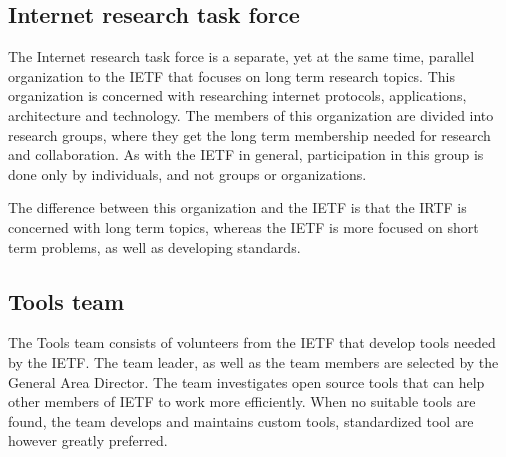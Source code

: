 \documentclass[a4paper,english]{report}
\begin{document}
\subsection{Internet research task force}
The Internet research task force is a separate, yet at the same time, parallel organization to the IETF  that focuses on long term research topics. This organization is concerned with researching internet protocols, applications, architecture and technology. The members of this organization are divided into research groups, where they get the long term membership needed for research and collaboration. As with the IETF in general, participation in this group is done only by individuals, and not groups or organizations.

The difference between this organization and the IETF is that the IRTF is concerned with long term topics, whereas the IETF is more focused on short term problems, as well as developing standards.


\subsection{Tools team}

The Tools team consists of volunteers from the IETF that develop tools needed by the IETF. The team leader, as well as the team members are selected by the General Area Director.
The team investigates open source tools that can help other members of IETF to work more efficiently. When no suitable tools are found, the team develops and maintains custom tools, standardized tool are however greatly preferred.\\
\end{document}
